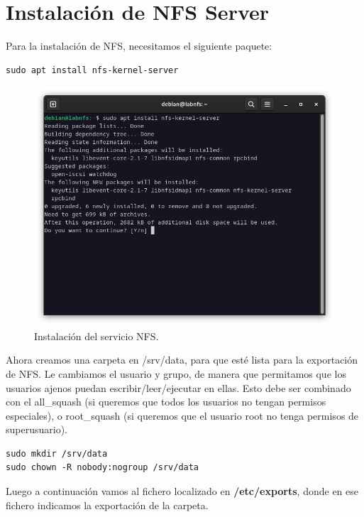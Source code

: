 \section{Instalación de NFS Server}


Para la instalación de NFS, necesitamos el siguiente paquete:

\begin{lstlisting}[style=mybash]
sudo apt install nfs-kernel-server
\end{lstlisting}

\begin{figure}[H]
	\centering
	\includegraphics[scale=0.30]{00}
	\caption{Instalación del servicio NFS.}
\end{figure}


Ahora creamos una carpeta en /srv/data, para que esté lista para la exportación de NFS. Le cambiamos el usuario y grupo, de manera que permitamos que los usuarios ajenos puedan escribir/leer/ejecutar en ellas. Esto debe ser combinado con el all\_squash (si queremos que todos los usuarios no tengan permisos especiales), o root\_squash (si queremos que el usuario root no tenga permisos de superusuario).

\begin{lstlisting}[style=mybash]
sudo mkdir /srv/data
sudo chown -R nobody:nogroup /srv/data
\end{lstlisting}

Luego a continuación vamos al fichero localizado en \textbf{/etc/exports}, donde en ese fichero indicamos la exportación de la carpeta.


